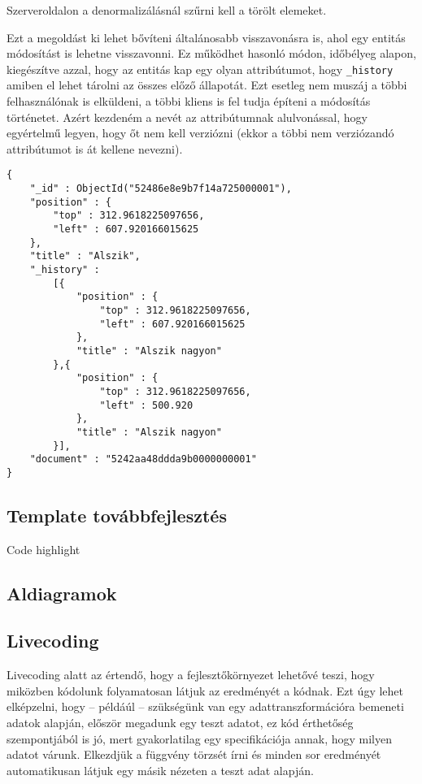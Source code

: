 Szerveroldalon a denormalizálásnál szűrni kell a törölt elemeket.

Ezt a megoldást ki lehet bővíteni általánosabb visszavonásra is, ahol egy entitás módosítást is lehetne visszavonni. Ez működhet hasonló módon, időbélyeg alapon, kiegészítve azzal, hogy az entitás kap egy olyan attribútumot, hogy \lstinline{_history} amiben el lehet tárolni az összes előző állapotát. Ezt esetleg nem muszáj a többi felhasználónak is elküldeni, a többi kliens is fel tudja építeni a módosítás történetet. Azért kezdeném a nevét az attribútumnak alulvonással, hogy egyértelmű legyen, hogy őt nem kell verziózni (ekkor a többi nem verziózandó attribútumot is át kellene nevezni).

\begin{lstlisting}[caption=Entitás történettel együtt]
  {
    "_id" : ObjectId("52486e8e9b7f14a725000001"),
    "position" : {
        "top" : 312.9618225097656,
        "left" : 607.920166015625
    },
    "title" : "Alszik",
    "_history" :
        [{
            "position" : {
                "top" : 312.9618225097656,
                "left" : 607.920166015625
            },
            "title" : "Alszik nagyon"
        },{
            "position" : {
                "top" : 312.9618225097656,
                "left" : 500.920
            },
            "title" : "Alszik nagyon"
        }],
    "document" : "5242aa48ddda9b0000000001"
}
\end{lstlisting}

\subsection{Template továbbfejlesztés}

Code highlight

\subsection{Aldiagramok}

\subsection{Livecoding}

Livecoding alatt az értendő, hogy a fejlesztőkörnyezet lehetővé teszi, hogy miközben kódolunk folyamatosan látjuk az eredményét a kódnak. Ezt úgy lehet elképzelni, hogy -- példáúl -- szükségünk van egy adattranszformációra bemeneti adatok alapján, először megadunk egy teszt adatot, ez kód érthetőség szempontjából is jó, mert gyakorlatilag egy specifikációja annak, hogy milyen adatot várunk. Elkezdjük a függvény törzsét írni és minden sor eredményét automatikusan látjuk egy másik nézeten a teszt adat alapján.

